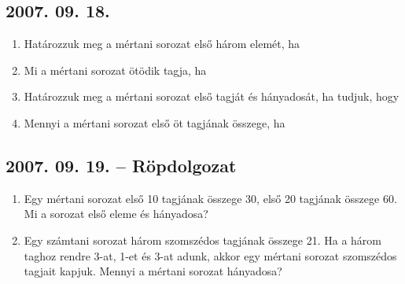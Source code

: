 \subsection*{2007. 09. 18.}
\begin{enumerate}
\item Határozzuk meg a mértani sorozat első három elemét, ha
\item Mi a mértani sorozat ötödik tagja, ha 
\item Határozzuk meg a mértani sorozat első tagját és hányadosát, ha tudjuk, hogy 
\item Mennyi a mértani sorozat első öt tagjának összege, ha
\end{enumerate}

\subsection*{2007. 09. 19. -- Röpdolgozat}
\begin{enumerate}
\item Egy mértani sorozat első 10 tagjának összege 30, első 20 tagjának összege 60.
Mi a sorozat első eleme és hányadosa?
\item Egy számtani sorozat három szomszédos tagjának összege 21. Ha a három taghoz rendre
3-at, 1-et és 3-at adunk, akkor egy mértani sorozat szomszédos tagjait kapjuk. Mennyi a mértani sorozat 
hányadosa?
\end{enumerate}

